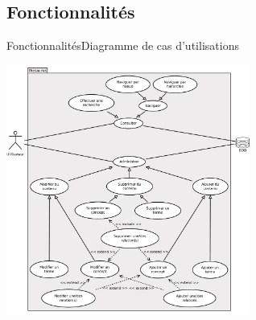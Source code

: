 \subsection{Fonctionnalités}
\begin{frame}{Fonctionnalités}{Diagramme de cas d'utilisations}
\begin{center}
\includegraphics[width=0.6\textwidth]{files/usecase}
\end{center}
\end{frame}
